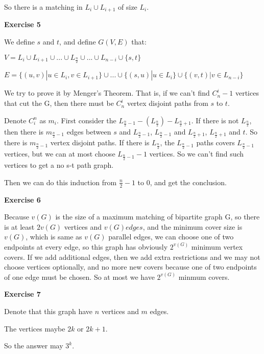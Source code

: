 \documentclass{article}
\begin{document}
So there is a matching in $L_{i} \cup L_{i+1}$ of size $L_{i}$.



\textbf{Exercise 5}

We define $s$ and $t$, and define $G(V,E)$ that:

$V = L_{i} \cup L_{i+1} \cup ... \cup L_{\frac{n}{2}} \cup ... \cup L_{n-i}  \cup \{s, t\}$

$E = \{  (u,v) | u \in L_{i}, v \in L_{i+1} \}\cup ... \cup \{(s,u) | u \in L_{i} \} \cup \{(v,t) | v \in L_{n-i} \}$

We try to prove it by Menger’s Theorem. That is, if we can't find $C^{i}_{n} - 1$ vertices that cut the G, then there must be $C^{i}_{n}$ vertex disjoint paths from $s$ to $t$.

Denote $C_{i}^{n}$ as $m_i$. First consider the $L_{\frac{n}{2}-1} - (L_{\frac{n}{2}}) - L_{\frac{n}{2}+1}$. If there is not $L_{\frac{n}{2}}$, then there is $m_{\frac{n}{2}-1}$ edges between $s$ and $L_{\frac{n}{2} - 1}$, $L_{\frac{n}{2} - 1}$ and $L_{\frac{n}{2} + 1}$, $L_{\frac{n}{2} + 1}$ and $t$. So there is $m_{\frac{n}{2}-1}$ vertex disjoint paths. If there is $L_{\frac{n}{2}}$, the $L_{\frac{n}{2} -1}$ paths covers $L_{\frac{n}{2} - 1}$ vertices, but we can at most choose $L_{\frac{n}{2} - 1} - 1$ vertices. So we can't find such vertices to get a no s-t path graph.

Then we can do this induction from $\frac{n}{2}-1$ to $0$, and get the conclusion. 



\textbf{Exercise 6}

Because $v(G)$ is the size of a maximum matching of bipartite graph G, so there is at least $2v(G)$ vertices and $v(G) edges$, and the minimum cover size is $v(G)$, which is same as $v(G)$ parallel edges, we can choose one of two endpoints at every edge, so this graph has obviously $2^{v(G)}$ minimum vertex covers. If we add additional edges, then we add extra restrictions and we may not choose vertices optionally, and no more new covers because one of two endpoints of one edge must be chosen. So at most we have $2^{v(G)}$ minmum covers.

\textbf{Exercise 7}

Denote that this graph have $n$ vertices and $m$ edges.

The vertices maybe $2k$ or $2k+1$.

So the answer may $3^k$.
\end{document}
